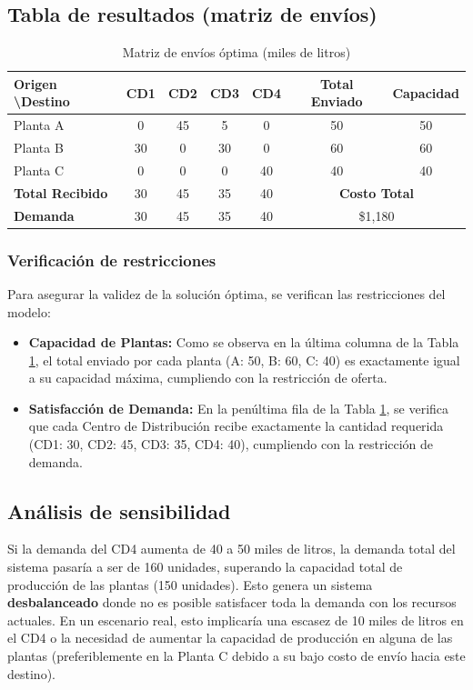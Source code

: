 \documentclass[12pt]{article}
\begin{document}
\subsection{Tabla de resultados (matriz de envíos)}
\begin{table}[H]
    \centering
    \caption{Matriz de envíos óptima (miles de litros)}
    \begin{tabular}{|l|c|c|c|c|c|c|}
        \hline
        \textbf{Origen \textbackslash Destino} & \textbf{CD1} & \textbf{CD2} & \textbf{CD3} & \textbf{CD4} & \textbf{Total Enviado} & \textbf{Capacidad} \\ \hline
        Planta A & 0 & 45 & 5 & 0 & 50 & 50 \\ \hline
        Planta B & 30 & 0 & 30 & 0 & 60 & 60 \\ \hline
        Planta C & 0 & 0 & 0 & 40 & 40 & 40 \\ \hline
        \textbf{Total Recibido} & 30 & 45 & 35 & 40 & \multicolumn{2}{c|}{\textbf{Costo Total}} \\ \hline
        \textbf{Demanda} & 30 & 45 & 35 & 40 & \multicolumn{2}{c|}{\$1,180} \\ \hline
    \end{tabular}
    \label{tab:matriz_envios}
\end{table}

\subsubsection{Verificación de restricciones}
Para asegurar la validez de la solución óptima, se verifican las restricciones del modelo:
\begin{itemize}
    \item \textbf{Capacidad de Plantas:} Como se observa en la última columna de la Tabla \ref{tab:matriz_envios}, el total enviado por cada planta (A: 50, B: 60, C: 40) es exactamente igual a su capacidad máxima, cumpliendo con la restricción de oferta.
    \item \textbf{Satisfacción de Demanda:} En la penúltima fila de la Tabla \ref{tab:matriz_envios}, se verifica que cada Centro de Distribución recibe exactamente la cantidad requerida (CD1: 30, CD2: 45, CD3: 35, CD4: 40), cumpliendo con la restricción de demanda.
\end{itemize}

\subsection{Análisis de sensibilidad}
Si la demanda del CD4 aumenta de 40 a 50 miles de litros, la demanda total del sistema pasaría a ser de 160 unidades, superando la capacidad total de producción de las plantas (150 unidades). Esto genera un sistema \textbf{desbalanceado} donde no es posible satisfacer toda la demanda con los recursos actuales. En un escenario real, esto implicaría una escasez de 10 miles de litros en el CD4 o la necesidad de aumentar la capacidad de producción en alguna de las plantas (preferiblemente en la Planta C debido a su bajo costo de envío hacia este destino).
\end{document}
